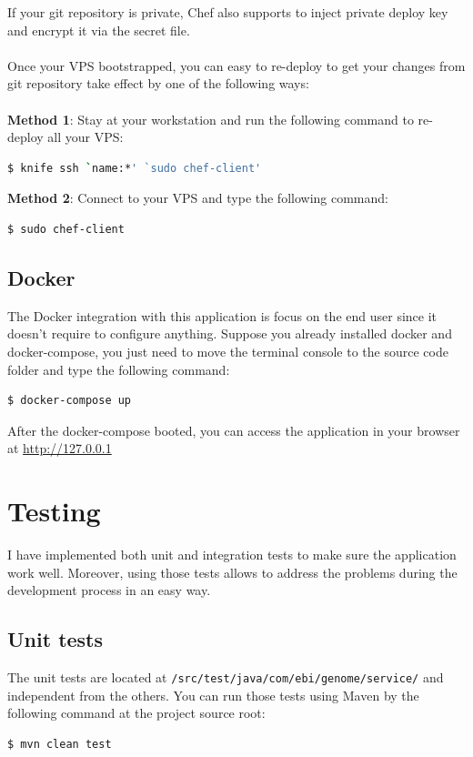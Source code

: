 \documentclass[a4paper,12pt]{article}
\begin{document}
If your git repository is private, Chef also supports to inject private deploy key and encrypt it via the secret file.
\\\\
Once your VPS bootstrapped, you can easy to re-deploy to get your changes from git repository take effect by one of the following ways:
\\
\\
\indent\textbf{Method 1}: Stay at your workstation and run the following command to re-deploy all your VPS:
\begin{lstlisting}[language=bash]
  $ knife ssh `name:*' `sudo chef-client'
\end{lstlisting}

\textbf{Method 2}: Connect to your VPS and type the following command:
\begin{lstlisting}[language=bash]
  $ sudo chef-client
\end{lstlisting}
\subsection{Docker}
The Docker integration with this application is focus on the end user since it doesn't require to configure anything.
Suppose you already installed docker and docker-compose, you just need to move the terminal console to the source code folder and type the following command:
\begin{lstlisting}[language=bash]
$ docker-compose up
\end{lstlisting}
After the docker-compose booted, you can access the application in your browser at \url{http://127.0.0.1}

\section{Testing}
I have implemented both unit and integration tests to make sure the application work well. Moreover, using those tests allows to address the problems during the development process in an easy way.
\subsection{Unit tests}
The unit tests are located at \texttt{/src/test/java/com/ebi/genome/service/} and independent from the others. You can run those tests using Maven by the following command at the project source root:
\\
\begin{lstlisting}[language=bash]
  $ mvn clean test
\end{lstlisting}
\end{document}
